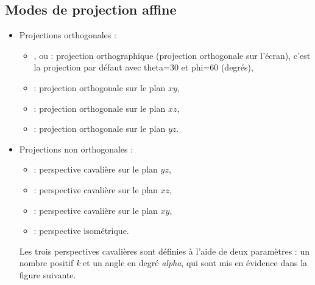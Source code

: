 \subsection{Modes de projection affine}

\begin{itemize}
    \item Projections orthogonales :
        \begin{itemize}
            \item {}, ou  : projection orthographique (projection orthogonale sur l'écran), c'est la projection par défaut avec theta=30 et phi=60 (degrés),
            \item {} : projection orthogonale sur le plan $xy$,
            \item {} : projection orthogonale sur le plan $xz$,
            \item {} : projection orthogonale sur le plan $yz$.
        \end{itemize}
    \item Projections non orthogonales :
        \begin{itemize}
            \item {} : perspective cavalière sur le plan $yz$,
            \item {} : perspective cavalière sur le plan $xz$,
            \item {} : perspective cavalière sur le plan $xy$,
            \item {} : perspective isométrique.
        \end{itemize}
        Les trois perspectives cavalières sont définies à l'aide de deux paramètres : un nombre positif \emph{k} et un angle en degré \emph{alpha}, qui sont mis en évidence dans la figure suivante.
\end{itemize}

